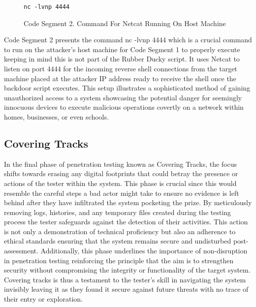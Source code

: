 \documentclass[manuscript,acmsmall,anonymous,review,screen,nonacm=true, authorversion=true]{acmart}
\begin{document}
\begin{figure}
   \begin{verbatim}
nc -lvnp 4444
\end{verbatim}
    \caption{Code Segment 2. Command For Netcat Running On Host Machine}
    \label{fig:enter-label}
\end{figure}
Code Segment 2 presents the command nc -lvnp 4444 which is a crucial command to run
on the attacker's host machine for Code Segment 1 to properly execute keeping in mind this is
not part of the Rubber Ducky script. It uses Netcat to listen on port 4444 for the
incoming reverse shell connections from the target machine placed at the attacker IP address
ready to receive the shell once the backdoor script executes. This setup illustrates a
sophisticated method of gaining unauthorized access to a system showcasing the potential danger
for seemingly innocuous devices to execute malicious operations covertly on a network within
homes, businesses, or even schools.

\subsection{Covering Tracks}
In the final phase of penetration testing known as Covering Tracks, the focus shifts
towards erasing any digital footprints that could betray the presence or actions of the tester
within the system. This phase is crucial since this would resemble the careful
steps a bad actor might take to ensure no evidence is left behind after they have infiltrated the
system pocketing the prize. By meticulously removing logs, histories, and any
temporary files created during the testing process the tester safeguards against the detection of
their activities. This action is not only a demonstration of technical proficiency
but also an adherence to ethical standards ensuring that the system remains secure and
undisturbed post-assessment. Additionally, this phase underlines the importance
of non-disruption in penetration testing reinforcing the principle that the aim is to strengthen
security without compromising the integrity or functionality of the target system.
Covering tracks is thus a testament to the tester's skill in navigating the system invisibly leaving
it as they found it secure against future threats with no trace of their entry or exploration.
\end{document}
